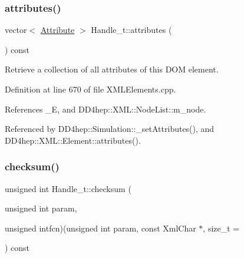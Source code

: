 \hypertarget{class_d_d4hep_1_1_x_m_l_1_1_handle__t_a4b3f1f70c1fec3f3c374f68f36cddfa8}{}\label{class_d_d4hep_1_1_x_m_l_1_1_handle__t_a4b3f1f70c1fec3f3c374f68f36cddfa8} 
\subsubsection{\texorpdfstring{attributes()}{attributes()}}
{\footnotesize\ttfamily vector$<$ \hyperlink{namespace_d_d4hep_1_1_x_m_l_a5c19b7116be99d69b4b22d911357baaf}{Attribute} $>$ Handle\+\_\+t\+::attributes (\begin{DoxyParamCaption}{ }\end{DoxyParamCaption}) const}



Retrieve a collection of all attributes of this D\+OM element. 



Definition at line 670 of file X\+M\+L\+Elements.\+cpp.



References \+\_\+E, and D\+D4hep\+::\+X\+M\+L\+::\+Node\+List\+::m\+\_\+node.



Referenced by D\+D4hep\+::\+Simulation\+::\+\_\+set\+Attributes(), and D\+D4hep\+::\+X\+M\+L\+::\+Element\+::attributes().

\hypertarget{class_d_d4hep_1_1_x_m_l_1_1_handle__t_aa6a43630db57d335bacc39d075982f5c}{}\label{class_d_d4hep_1_1_x_m_l_1_1_handle__t_aa6a43630db57d335bacc39d075982f5c} 
\subsubsection{\texorpdfstring{checksum()}{checksum()}}
{\footnotesize\ttfamily unsigned int Handle\+\_\+t\+::checksum (\begin{DoxyParamCaption}\item[{unsigned int}]{param,  }\item[{unsigned }]{intfcn)(unsigned int param, const Xml\+Char $\ast$, size\+\_\+t = {} }\end{DoxyParamCaption}) const}



